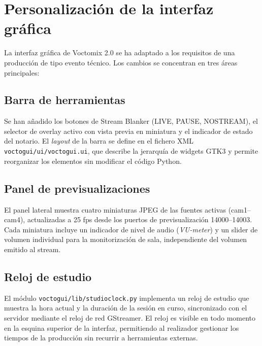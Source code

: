 \section{Personalización de la interfaz gráfica}

La interfaz gráfica de Voctomix 2.0 se ha adaptado a los requisitos de una producción
de tipo evento técnico. Los cambios se concentran en tres áreas principales:

\subsection{Barra de herramientas}

Se han añadido los botones de Stream Blanker (LIVE, PAUSE, NOSTREAM), el selector de
overlay activo con vista previa en miniatura y el indicador de estado del notario.
El \textit{layout} de la barra se define en el fichero XML
\texttt{voctogui/ui/voctogui.ui}, que describe la jerarquía de widgets GTK3 y permite
reorganizar los elementos sin modificar el código Python.

\subsection{Panel de previsualizaciones}

El panel lateral muestra cuatro miniaturas JPEG de las fuentes activas (cam1--cam4),
actualizadas a 25 fps desde los puertos de previsualización 14000--14003. Cada
miniatura incluye un indicador de nivel de audio (\textit{VU-meter}) y un slider de
volumen individual para la monitorización de sala, independiente del volumen emitido
al stream.

\subsection{Reloj de estudio}

El módulo \texttt{voctogui/lib/studioclock.py} implementa un reloj de estudio que
muestra la hora actual y la duración de la sesión en curso, sincronizado con el
servidor mediante el reloj de red GStreamer. El reloj es visible en todo momento
en la esquina superior de la interfaz, permitiendo al realizador gestionar los tiempos
de la producción sin recurrir a herramientas externas.


